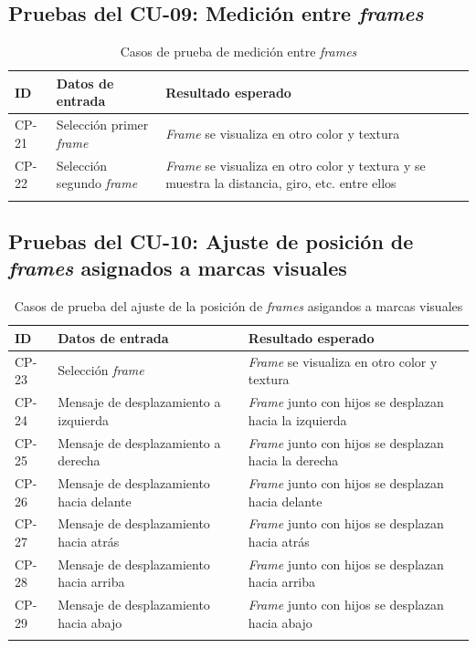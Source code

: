 \subsection{Pruebas del CU-09: Medición entre \textit{frames}}
\begin{longtable}{|p{1.5cm}|p{4cm}|p{4cm}|}
\hline
\textbf{ID} & \textbf{Datos de entrada} & \textbf{Resultado esperado} \\
\hline
CP-21 & Selección primer \textit{frame} & \textit{Frame} se visualiza en otro color y textura \\
\hline
CP-22 & Selección segundo \textit{frame} & \textit{Frame} se visualiza en otro color y textura y se muestra la distancia, giro, etc. entre ellos \\
\hline
\caption{Casos de prueba de medición entre \textit{frames}}
\end{longtable}

\newpage
\subsection{Pruebas del CU-10: Ajuste de posición de \textit{frames} asignados a marcas visuales}
\begin{longtable}{|p{1.5cm}|p{4cm}|p{4cm}|}
\hline
\textbf{ID} & \textbf{Datos de entrada} & \textbf{Resultado esperado} \\
\hline
CP-23 & Selección \textit{frame} & \textit{Frame} se visualiza en otro color y textura \\
\hline
CP-24 & Mensaje de desplazamiento a izquierda & \textit{Frame} junto con hijos se desplazan hacia la izquierda \\
\hline
CP-25 & Mensaje de desplazamiento a derecha & \textit{Frame} junto con hijos se desplazan hacia la derecha \\
\hline
CP-26 & Mensaje de desplazamiento hacia delante & \textit{Frame} junto con hijos se desplazan hacia delante \\
\hline
CP-27 & Mensaje de desplazamiento hacia atrás & \textit{Frame} junto con hijos se desplazan hacia atrás \\
\hline
CP-28 & Mensaje de desplazamiento hacia arriba & \textit{Frame} junto con hijos se desplazan hacia arriba \\
\hline
CP-29 & Mensaje de desplazamiento hacia abajo & \textit{Frame} junto con hijos se desplazan hacia abajo \\
\hline
\caption{Casos de prueba del ajuste de la posición de \textit{frames} asigandos a marcas visuales}
\end{longtable}


